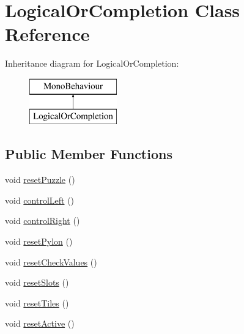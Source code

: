 \hypertarget{class_logical_or_completion}{}\section{Logical\+Or\+Completion Class Reference}
\label{class_logical_or_completion}
Inheritance diagram for Logical\+Or\+Completion\+:\begin{figure}[H]
\begin{center}
\leavevmode
\includegraphics[height=2.000000cm]{class_logical_or_completion}
\end{center}
\end{figure}
\subsection*{Public Member Functions}
\begin{DoxyCompactItemize}
\item 
void \hyperlink{class_logical_or_completion_a783c46d26a4f12f44b04b03863f42d95}{reset\+Puzzle} ()
\item 
void \hyperlink{class_logical_or_completion_af8cbd9a832c9c69ee46fb70020a7989b}{control\+Left} ()
\item 
void \hyperlink{class_logical_or_completion_a782b87c3afba79cbc18d704ab3583540}{control\+Right} ()
\item 
void \hyperlink{class_logical_or_completion_a250f9585b961379f94d16a564eec723a}{reset\+Pylon} ()
\item 
void \hyperlink{class_logical_or_completion_ac6b1be85673c5739f7eacd97f1811964}{reset\+Check\+Values} ()
\item 
void \hyperlink{class_logical_or_completion_a55e66d307bb74dbd3891e93a48d88131}{reset\+Slots} ()
\item 
void \hyperlink{class_logical_or_completion_abeb657802f2f8f3f6e768ca10bacfdb6}{reset\+Tiles} ()
\item 
void \hyperlink{class_logical_or_completion_a7a4f4c9e3a2b79189a21fefb8a81f919}{reset\+Active} ()
\end{DoxyCompactItemize}
